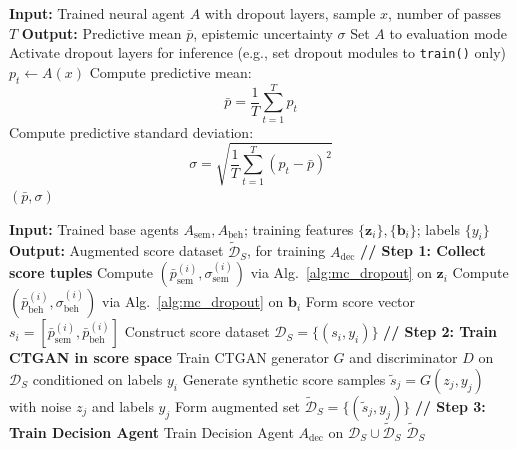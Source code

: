 \documentclass[lettersize,journal]{IEEEtran}
\begin{document}
\begin{algorithm}[t]
\caption{MC Dropout Uncertainty Estimation for a Neural Agent}
\label{alg:mc_dropout}
\begin{algorithmic}[1]
    \State \textbf{Input:} Trained neural agent $A$ with dropout layers, sample $x$, number of passes $T$
    \State \textbf{Output:} Predictive mean $\bar{p}$, epistemic uncertainty $\sigma$
    \vspace{1mm}
    \State Set $A$ to evaluation mode
    \State Activate dropout layers for inference (e.g., set dropout modules to \texttt{train()} only)
        \State $p_t \gets A(x)$ 
    \EndFor
    \State Compute predictive mean:
    \[
        \bar{p} = \frac{1}{T}\sum_{t=1}^{T} p_t
    \]
    \State Compute predictive standard deviation:
    \[
        \sigma = \sqrt{\frac{1}{T}\sum_{t=1}^{T} (p_t - \bar{p})^2}
    \]
    \State \Return $(\bar{p}, \sigma)$
\end{algorithmic}
\end{algorithm}



\begin{algorithm}[t]
\caption{Score-Level CTGAN Augmentation for Decision Agent Training}
\label{alg:ctgan_scores}
\begin{algorithmic}[1]
    \State \textbf{Input:} Trained base agents $A_{\text{sem}}, A_{\text{beh}}$; training features $\{\mathbf{z}_i\}, \{\mathbf{b}_i\}$; labels $\{y_i\}$
    \State \textbf{Output:} Augmented score dataset $\tilde{\mathcal{D}}_S$, for training $A_{\text{dec}}$
    \vspace{1mm}
    \Statex \textbf{// Step 1: Collect score tuples}
        \State Compute $(\bar{p}_{\text{sem}}^{(i)}, \sigma_{\text{sem}}^{(i)})$ via Alg.~\ref{alg:mc_dropout} on $\mathbf{z}_i$
        \State Compute $(\bar{p}_{\text{beh}}^{(i)}, \sigma_{\text{beh}}^{(i)})$ via Alg.~\ref{alg:mc_dropout} on $\mathbf{b}_i$
        \State Form score vector $s_i = [\bar{p}_{\text{sem}}^{(i)}, \bar{p}_{\text{beh}}^{(i)}]$
    \EndFor
    \State Construct score dataset $\mathcal{D}_S = \{(s_i, y_i)\}$
    \vspace{1mm}
    \Statex \textbf{// Step 2: Train CTGAN in score space}
    \State Train CTGAN generator $G$ and discriminator $D$ on $\mathcal{D}_S$ conditioned on labels $y_i$
    \State Generate synthetic score samples $\tilde{s}_j = G(z_j, y_j)$ with noise $z_j$ and labels $y_j$
    \State Form augmented set $\tilde{\mathcal{D}}_S = \{(\tilde{s}_j, y_j)\}$
    \Statex \textbf{// Step 3: Train Decision Agent}
    \State Train Decision Agent $A_{\text{dec}}$ on $\mathcal{D}_S \cup \tilde{\mathcal{D}}_S$
    \State \Return $\tilde{\mathcal{D}}_S$
\end{algorithmic}
\end{algorithm}
\end{document}
